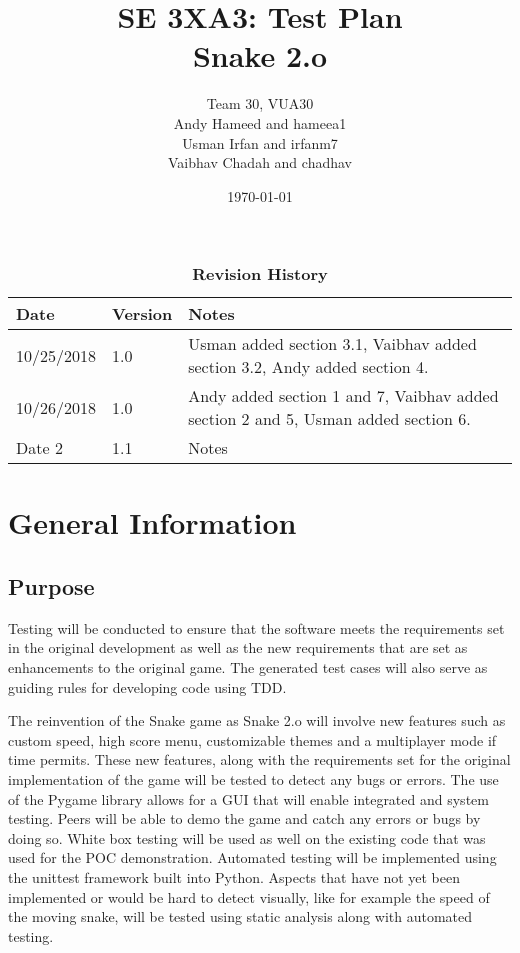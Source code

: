 \documentclass[12pt, titlepage]{article}
\title{SE 3XA3: Test Plan\\Snake 2.o}
\author{Team 30, VUA30
	\\ Andy Hameed and hameea1
	\\ Usman Irfan and irfanm7
	\\ Vaibhav Chadah and chadhav
}
\date{\today}
\begin{document}
\maketitle

\tableofcontents
\listoftables
\listoffigures

\begin{table}[bp]
\caption{\bf Revision History}
\begin{tabularx}{\textwidth}{p{3cm}p{2cm}X}
\toprule {\bf Date} & {\bf Version} & {\bf Notes}\\
\midrule
10/25/2018 & 1.0 & Usman added section 3.1, Vaibhav added section 3.2, Andy added section 4. \\
10/26/2018 & 1.0 & Andy added section 1 and 7, Vaibhav added section 2 and 5, Usman added section 6.\\
Date 2 & 1.1 & Notes\\
\bottomrule
\end{tabularx}
\end{table}

\newpage


\section{General Information}

\subsection{Purpose}
Testing will be conducted to ensure that the software meets the requirements set in the original development as well as the new requirements that are set as enhancements to the original game. The generated test cases will also serve as guiding rules for developing code using TDD.

The reinvention of the Snake game as Snake 2.o will involve new features such as custom speed, high score menu, customizable themes and a multiplayer mode if time permits. These new features, along with the requirements set for the original implementation of the game will be tested to detect any bugs or errors. The use of the Pygame library allows for a GUI that will enable integrated and system testing. Peers will be able to demo the game and catch any errors or bugs by doing so. White box testing will be used as well on the existing code that was used for the POC demonstration. Automated testing will be implemented using the unittest framework built into Python. Aspects  that have not yet been implemented or would be hard to detect visually, like for example the speed of the moving snake, will be tested using static analysis along with automated testing.
\end{document}
